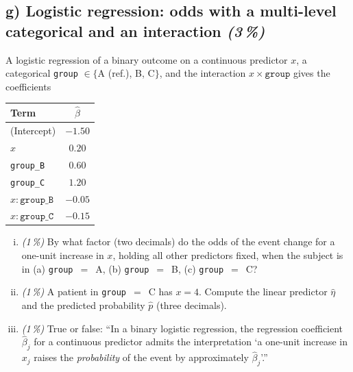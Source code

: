 \documentclass[11pt,a4paper]{article}
\newcommand{\subpoints}[1]{\textit{(#1\,\%)}}
\begin{document}
\subsection*{g) Logistic regression: odds with a multi-level categorical and an interaction \subpoints{3}}
A logistic regression of a binary outcome on a continuous predictor $x$, a categorical \texttt{group} $\in \{$A (ref.), B, C$\}$, and the interaction $x \times \texttt{group}$ gives the coefficients
\begin{center}\small
\begin{tabular}{lc}
\toprule
Term & $\hat\beta$ \\
\midrule
(Intercept)              & $-1.50$ \\
$x$                      & $0.20$  \\
\texttt{group\_B}        & $0.60$  \\
\texttt{group\_C}        & $1.20$  \\
$x:\texttt{group\_B}$    & $-0.05$ \\
$x:\texttt{group\_C}$    & $-0.15$ \\
\bottomrule
\end{tabular}
\end{center}

\begin{enumerate}[(i)]
  \item \subpoints{1} By what factor (two decimals) do the odds of the event change for a one-unit increase in $x$, holding all other predictors fixed, when the subject is in (a) \texttt{group}~$=$~A, (b) \texttt{group}~$=$~B, (c) \texttt{group}~$=$~C?
  \item \subpoints{1} A patient in \texttt{group}~$=$~C has $x = 4$. Compute the linear predictor $\hat\eta$ and the predicted probability $\hat p$ (three decimals).
  \item \subpoints{1} True or false: ``In a binary logistic regression, the regression coefficient $\hat\beta_j$ for a continuous predictor admits the interpretation `a one-unit increase in $x_j$ raises the \emph{probability} of the event by approximately $\hat\beta_j$'.''
\end{enumerate}
\end{document}
